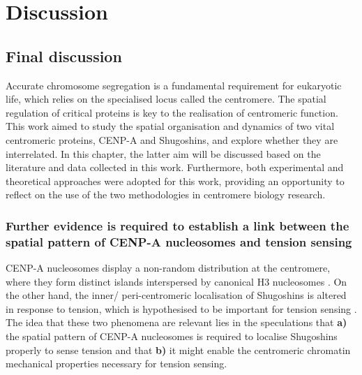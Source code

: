 \chapter{Discussion}

\section{Final discussion}

Accurate chromosome segregation is a fundamental requirement for eukaryotic life, which relies on the specialised locus called the centromere. The spatial regulation of critical proteins is key to the realisation of centromeric function. This work aimed to study the spatial organisation and dynamics of two vital centromeric proteins, CENP-A and Shugoshins, and explore whether they are interrelated. In this chapter, the latter aim will be discussed based on the literature and data collected in this work. Furthermore, both experimental and theoretical approaches were adopted for this work, providing an opportunity to reflect on the use of the two methodologies in centromere biology research. 

\subsection{Further evidence is required to establish a link between the spatial pattern of CENP-A nucleosomes and tension sensing}

CENP-A nucleosomes display a non-random distribution at the centromere, where they form distinct islands interspersed by canonical H3 nucleosomes \citep{Blower2002ConservedHumans, Dunleavy2011H3.3Phase., Kyriacou2018}. On the other hand, the inner/ peri-centromeric localisation of Shugoshins is altered in response to tension, which is hypothesised to be important for tension sensing \citep{Huang2007, Liu2013, Asai2020, Lee2008, Gomez2007, Eshleman2014, Nerusheva2014, Paldi2020ConvergentPericentromeres, Clarke2005, Kawashima2007}. The idea that these two phenomena are relevant lies in the speculations that \textbf{a)} the spatial pattern of CENP-A nucleosomes is required to localise Shugoshins properly to sense tension and that \textbf{b)} it might enable the centromeric chromatin mechanical properties necessary for tension sensing. 

